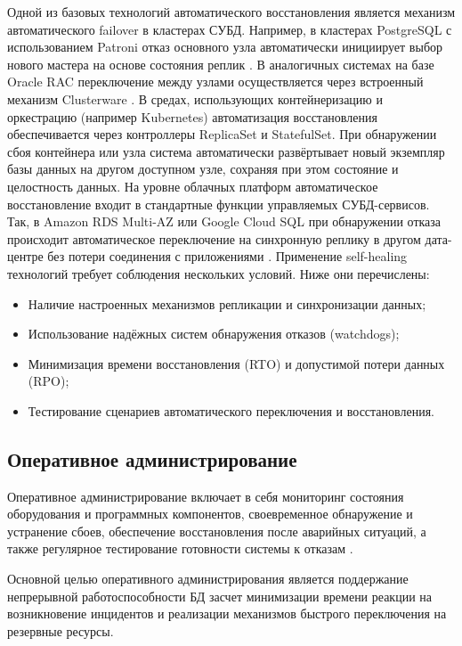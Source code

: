 Одной из базовых технологий автоматического восстановления является механизм автоматического failover в кластерах СУБД. Например, в кластерах PostgreSQL с использованием Patroni отказ основного узла автоматически инициирует выбор нового мастера на основе состояния реплик \autocite{Kleppmann}. В аналогичных системах на базе Oracle RAC переключение между узлами осуществляется через встроенный механизм Clusterware \autocite{OracleRAC}.
В средах, использующих контейнеризацию и оркестрацию (например Kubernetes) автоматизация восстановления обеспечивается через контроллеры ReplicaSet и StatefulSet. При обнаружении сбоя контейнера или узла система автоматически развёртывает новый экземпляр базы данных на другом доступном узле, сохраняя при этом состояние и целостность данных.
На уровне облачных платформ автоматическое восстановление входит в стандартные функции управляемых СУБД-сервисов. Так, в Amazon RDS Multi-AZ или Google Cloud SQL при обнаружении отказа происходит автоматическое переключение на синхронную реплику в другом дата-центре без потери соединения с приложениями \autocite{AmazonRds2}.
Применение self-healing технологий требует соблюдения нескольких условий. Ниже они перечислены:
\begin{itemize}
    \item Наличие настроенных механизмов репликации и синхронизации данных;
    \item Использование надёжных систем обнаружения отказов (watchdogs);
    \item Минимизация времени восстановления (RTO) и допустимой потери данных (RPO);
    \item Тестирование сценариев автоматического переключения и восстановления.
\end{itemize}


\subsection{Оперативное администрирование}

Оперативное администрирование включает в себя мониторинг состояния оборудования и программных компонентов, своевременное обнаружение и устранение сбоев, обеспечение восстановления после аварийных ситуаций, а также регулярное тестирование готовности системы к отказам \autocite{SameerParadkar, heycoachHAA}.

Основной целью оперативного администрирования является поддержание непрерывной работоспособности БД засчет минимизации времени реакции на возникновение инцидентов и реализации механизмов быстрого переключения на резервные ресурсы.


